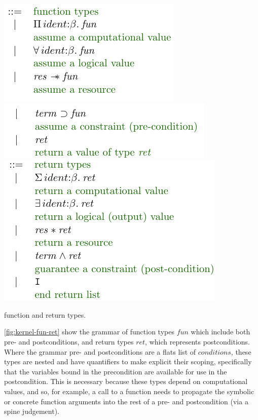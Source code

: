 \begin{marginfigure}
    \centering
    \includegraphics{figures/kernel-fun-1}
    \includegraphics{figures/kernel-fun-2}
    \includegraphics{figures/kernel-ret}
    \caption{ function and return types.}\label{fig:kernel-fun-ret}
\end{marginfigure}

\cref{fig:kernel-fun-ret} show the grammar of function types ${fun}$ which
include both pre- and postconditions, and return types ${ret}$, which
represents postconditions. Where the  grammar pre- and postconditions
are a flats list of ${conditions}$, these types are nested and have quantifiers
to make explicit their scoping, specifically that the variables bound in the
precondition are available for use in the postcondition. This is necessary
because these types depend on computational values, and so, for example, a call
to a function needs to propagate the symbolic or concrete function arguments
into the rest of a pre- and postcondition (via a spine judgement).

